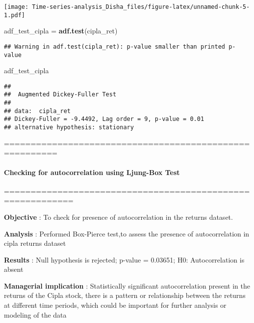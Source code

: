\documentclass[
]{article}
\newenvironment{Shaded}{\begin{snugshade}}{\end{snugshade}}
\newcommand{\FunctionTok}[1]{\textcolor[rgb]{0.13,0.29,0.53}{\textbf{#1}}}
\newcommand{\NormalTok}[1]{#1}
\newcommand{\OtherTok}[1]{\textcolor[rgb]{0.56,0.35,0.01}{#1}}
\begin{document}
\texttt{[image: Time-series-analysis\_Disha\_files/figure-latex/unnamed-chunk-5-1.pdf]}

\begin{Shaded}
\begin{Highlighting}[]
\NormalTok{adf\_test\_cipla }\OtherTok{=} \FunctionTok{adf.test}\NormalTok{(cipla\_ret)}
\end{Highlighting}
\end{Shaded}

\begin{verbatim}
## Warning in adf.test(cipla_ret): p-value smaller than printed p-value
\end{verbatim}

\begin{Shaded}
\begin{Highlighting}[]
\NormalTok{adf\_test\_cipla}
\end{Highlighting}
\end{Shaded}

\begin{verbatim}
## 
##  Augmented Dickey-Fuller Test
## 
## data:  cipla_ret
## Dickey-Fuller = -9.4492, Lag order = 9, p-value = 0.01
## alternative hypothesis: stationary
\end{verbatim}

========================================================

\hypertarget{checking-for-autocorrelation-using-ljung-box-test}{%
\paragraph{\texorpdfstring{\textbf{Checking for autocorrelation using
Ljung-Box
Test}}{Checking for autocorrelation using Ljung-Box Test}}\label{checking-for-autocorrelation-using-ljung-box-test}}

===========================================================

\textbf{Objective} : To check for presence of autocorrelation in the
returns dataset.

\textbf{Analysis} : Performed Box-Pierce test,to assess the presence of
autocorrelation in cipla returns dataset

\textbf{Results} : Null hypothesis is rejected; p-value = 0.03651; H0:
Autocorrelation is absent

\textbf{Managerial implication} : Statistically significant
autocorrelation present in the returns of the Cipla stock, there is a
pattern or relationship between the returns at different time periods,
which could be important for further analysis or modeling of the data
\end{document}
